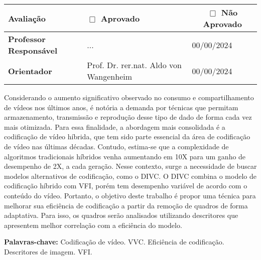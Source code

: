 \begin{folhadeaprovacao}
	\vspace{-4pt}

	\tiny
	\noindent \begin{tabularx}{\textwidth}{| l | X | l | l |}
		\hline
		{\textbf{Avaliação}}             & \multicolumn{1}{l}{\textbf{$\Box$ Aprovado}} & \multicolumn{2}{c|}{\textbf{$\Box$ Não Aprovado}}   \\ \hline
		{\textbf{Professor Responsável}} & {...}                                        & {00/00/2024}                                      & \\ \hline
		{\textbf{Orientador}}            & {Prof. Dr. rer.nat. Aldo von Wangenheim}     & {00/00/2024}                                      & \\ \hline
	\end{tabularx}
\end{folhadeaprovacao}

\setlength{\absparsep}{18pt}
\begin{resumo}
	\SingleSpacing

	Considerando o aumento significativo observado no consumo e compartilhamento de vídeos nos últimos anos, é notória a demanda por técnicas que permitam armazenamento, transmissão e reprodução desse tipo de dado de forma cada vez mais otimizada.
	Para essa finalidade, a abordagem mais consolidada é a codificação de vídeo híbrida, que tem sido parte essencial da área de codificação de vídeo nas últimas décadas.
	Contudo, estima-se que a complexidade de algoritmos tradicionais híbridos venha aumentando em 10X para um ganho de desempenho de 2X, a cada geração.
	Nesse contexto, surge a necessidade de buscar modelos alternativos de codificação, como o \ac{DIVC}.
	O \ac{DIVC} combina o modelo de codificação híbrido com \ac{VFI}, porém tem desempenho variável de acordo com o conteúdo do vídeo.
	Portanto, o objetivo deste trabalho é propor uma técnica para melhorar sua eficiência de codificação a partir da remoção de quadros de forma adaptativa. Para isso, os quadros serão analisados utilizando descritores que apresentem melhor correlação com a eficiência do modelo.

	\textbf{Palavras-chave:} Codificação de vídeo. VVC. Eficiência de codificação. Descritores de imagem. VFI.
\end{resumo}



{
\hypersetup{hidelinks}
\imprimirlistadesiglas
\tableofcontents*
\cleardoublepage
}
